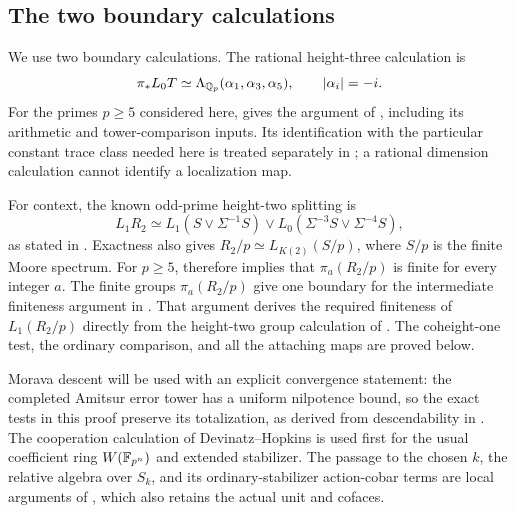 \subsection{The two boundary calculations}

We use two boundary calculations. The rational height-three
calculation is
\begin{equation}\label{h3:eq:framework-rational-boundary}
 \pi_*L_0T
 \simeq \Lambda_{\mathbb Q_p}(\alpha_1,\alpha_3,\alpha_5),
 \qquad |\alpha_i|=-i.
\end{equation}
For the primes \(p\geq5\) considered here, 
gives the argument of \cite[Theorem~A]{BSSW}, including its arithmetic
and tower-comparison inputs. Its identification with the particular
constant trace class needed here is treated separately in
; a rational dimension calculation cannot identify
a localization map.

For context, the known odd-prime height-two splitting is
\begin{equation}\label{h3:eq:framework-height-two-boundary}
 L_1R_2\simeq
 L_1(S\vee\Sigma^{-1}S)
 \vee L_0(\Sigma^{-3}S\vee\Sigma^{-4}S),
\end{equation}
as stated in \cite[Theorem~6.7]{BB}.  Exactness also gives
\(R_2/p\simeq L_{K(2)}(S/p)\), where \(S/p\) is the finite Moore
spectrum.  For \(p\geq5\), \cite[Theorem~15.1]{HS99} therefore implies
that \(\pi_a(R_2/p)\) is finite for every integer \(a\).
The finite groups \(\pi_a(R_2/p)\) give one boundary for the
intermediate finiteness argument in .  That
argument derives the required finiteness of \(L_1(R_2/p)\) directly
from the height-two group calculation of \cite[Remark~7.8]{Behrens2012}.
The coheight-one test, the ordinary comparison, and all the attaching
maps are proved below.

Morava descent will be used with an explicit convergence statement:
the completed Amitsur error tower has a uniform nilpotence bound, so
the exact tests in this proof preserve its totalization, as derived
from descendability in .  The cooperation
calculation of Devinatz--Hopkins
\cite[Theorem~2(ii) and Proposition~2.2]{DevinatzHopkins} is used
first for the usual coefficient ring $W(\mathbb F_{p^n})$ and extended
stabilizer.  The passage to the chosen $k$, the relative algebra over
$S_k$, and its ordinary-stabilizer action-cobar terms are local
arguments of , which also retains the actual unit
and cofaces.
